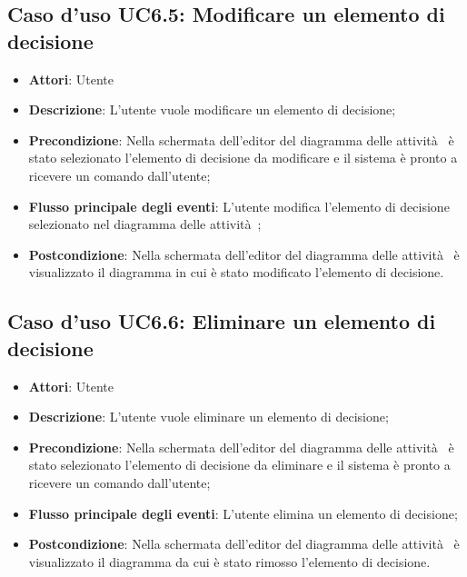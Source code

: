 \documentclass[../AnalisiDeiRequisiti.tex]{subfiles}
\begin{document}
				\subsection{Caso d'uso UC6.5: Modificare un elemento di decisione}
				\begin{itemize}
					\item \textbf{Attori}: Utente
					\item \textbf{Descrizione}: L'utente vuole modificare un elemento di decisione;
					\item \textbf{Precondizione}: Nella schermata dell'editor del diagramma delle attività  è stato selezionato l'elemento di decisione da modificare e il sistema è pronto a ricevere un comando dall'utente;
					\item \textbf{Flusso principale degli eventi}: L'utente modifica l'elemento di decisione selezionato nel diagramma delle attività ;
					\item \textbf{Postcondizione}: Nella schermata dell'editor del diagramma delle attività  è visualizzato il diagramma in cui è stato modificato l'elemento di decisione.
				\end{itemize}
				\subsection{Caso d'uso UC6.6: Eliminare un elemento di decisione}
				\begin{itemize}
					\item \textbf{Attori}: Utente
					\item \textbf{Descrizione}: L'utente vuole eliminare un elemento di decisione;
					\item \textbf{Precondizione}: Nella schermata dell'editor del diagramma delle attività  è stato selezionato l'elemento di decisione da eliminare e il sistema è pronto a ricevere un comando dall'utente;
					\item \textbf{Flusso principale degli eventi}: L'utente elimina un elemento di decisione;
					\item \textbf{Postcondizione}: Nella schermata dell'editor del diagramma delle attività  è visualizzato il diagramma da cui è stato rimosso l'elemento di decisione.
				\end{itemize}
\end{document}
